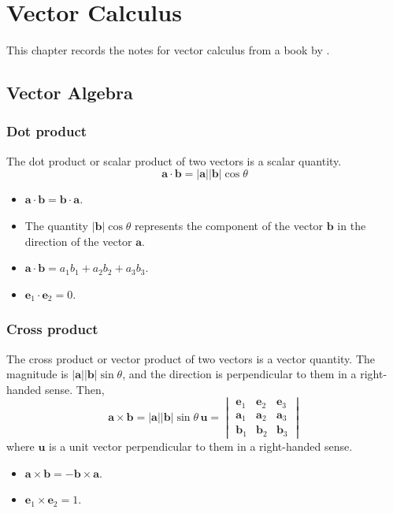 \chapter{Vector Calculus}
This chapter records the notes for vector calculus from a book by \citet{matthews1998vector}.

\section{Vector Algebra}
\subsection{Dot product}
The dot product or scalar product of two vectors is a scalar quantity.
\begin{equation}
    \bm{a} \cdot \bm{b} = |\bm{a}| |\bm{b}| \cos \theta
\end{equation}
\begin{itemize}
    \item $ \bm{a}\cdot \bm{b} = \bm{b}\cdot \bm{a} $.
    \item The quantity $|\bm{b}|\cos \theta$ represents the component of the vector $\bm{b}$ in the direction of the vector $\bm{a}$.
    \item $ \bm{a}\cdot \bm{b} = a_1 b_1 + a_2 b_2 + a_3 b_3 $.
    \item $\bm{e}_1 \cdot \bm{e}_2 = 0$. 
\end{itemize}
    
\subsection{Cross product}
The cross product or vector product of two vectors is a vector quantity. 
The magnitude is $|\bm{a}| |\bm{b}| \sin \theta$, and the direction is perpendicular to them in a right-handed sense. 
Then,
\begin{equation}
    \bm{a} \times \bm{b} 
    = |\bm{a}| |\bm{b}| \sin \theta\,\bm{u}
    =   
        \begin{vmatrix}
            \bm{e}_1 & \bm{e}_2 & \bm{e}_3 \\
            \bm{a}_1 & \bm{a}_2 & \bm{a}_3 \\
            \bm{b}_1 & \bm{b}_2 & \bm{b}_3 
        \end{vmatrix}
\end{equation}
where $\bm{u}$ is a unit vector perpendicular to them in a right-handed sense. 
\begin{itemize}
    \item $\bm{a} \times \bm{b} = - \bm{b} \times \bm{a}$.
    \item $\bm{e}_1 \times \bm{e}_2 = 1$. 
\end{itemize}

